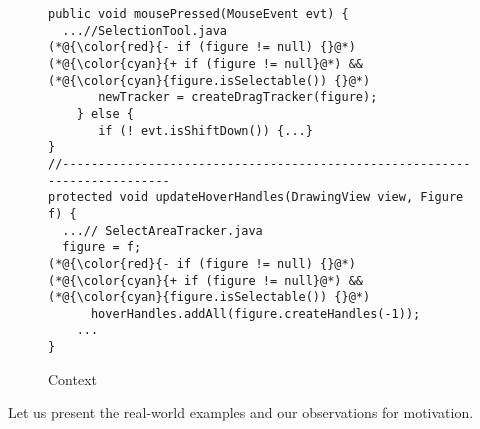 \begin{figure}[t]
	\centering
	\begin{lstlisting}[]
public void mousePressed(MouseEvent evt) { 
  ...//SelectionTool.java
(*@{\color{red}{- if (figure != null) {}@*)
(*@{\color{cyan}{+ if (figure != null}@*) && (*@{\color{cyan}{figure.isSelectable()) {}@*)
       newTracker = createDragTracker(figure);
    } else {
       if (! evt.isShiftDown()) {...}
}
//--------------------------------------------------------------------------
protected void updateHoverHandles(DrawingView view, Figure f) {
  ...// SelectAreaTracker.java
  figure = f;
(*@{\color{red}{- if (figure != null) {}@*)
(*@{\color{cyan}{+ if (figure != null}@*) && (*@{\color{cyan}{figure.isSelectable()) {}@*)
      hoverHandles.addAll(figure.createHandles(-1));
    ...
}
	\end{lstlisting}
        \vspace{-15pt}
        \caption{Context}
        \vspace{-6pt}
        \label{fig:motiv-context}
\end{figure}

Let us present the real-world examples and our observations for
motivation.

